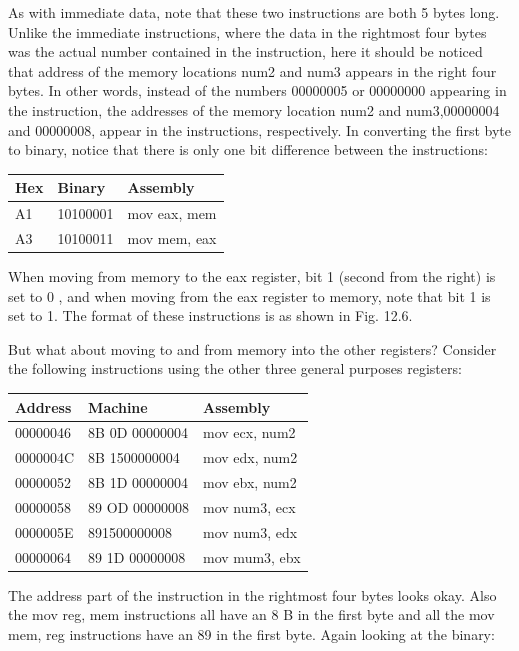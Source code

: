 \documentclass[10pt]{article}
\begin{document}
As with immediate data, note that these two instructions are both 5 bytes long. Unlike the immediate instructions, where the data in the rightmost four bytes was the actual number contained in the instruction, here it should be noticed that address of the memory locations num2 and num3 appears in the right four bytes. In other words, instead of the numbers 00000005 or 00000000 appearing in the instruction, the addresses of the memory location num2 and num3,00000004 and 00000008, appear in the instructions, respectively. In converting the first byte to binary, notice that there is only one bit difference between the instructions:

\begin{center}
\begin{tabular}{|l|l|l|}
\hline
Hex & Binary & Assembly \\
\hline
A1 & 10100001 & mov eax, mem \\
\hline
A3 & 10100011 & mov mem, eax \\
\hline
\end{tabular}
\end{center}

When moving from memory to the eax register, bit 1 (second from the right) is set to 0 , and when moving from the eax register to memory, note that bit 1 is set to 1. The format of these instructions is as shown in Fig. 12.6.

But what about moving to and from memory into the other registers? Consider the following instructions using the other three general purposes registers:

\begin{center}
\begin{tabular}{|l|l|l|}
\hline
Address & Machine & Assembly \\
\hline
00000046 & 8B 0D 00000004 & mov ecx, num2 \\
\hline
0000004C & 8B 1500000004 & mov edx, num2 \\
\hline
00000052 & 8B 1D 00000004 & mov ebx, num2 \\
\hline
00000058 & 89 OD 00000008 & mov num3, ecx \\
\hline
0000005E & 891500000008 & mov num3, edx \\
\hline
00000064 & 89 1D 00000008 & mov mum3, ebx \\
\hline
\end{tabular}
\end{center}

The address part of the instruction in the rightmost four bytes looks okay. Also the mov reg, mem instructions all have an 8 B in the first byte and all the mov mem, reg instructions have an 89 in the first byte. Again looking at the binary:
\end{document}
